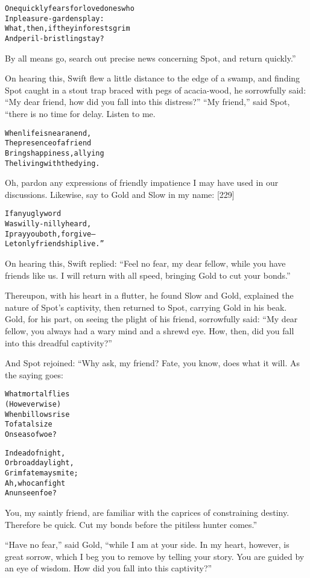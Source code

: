 \documentclass{article}
\renewenvironment{verbatim}{\begin{alltt}\normalfont\begin{centering}}{\end{centering}\end{alltt}}
\begin{document}
\begin{verbatim}
One quickly fears for loved ones who
    In pleasure-gardens play:
What, then, if they in forests grim
    And peril-bristling stay?
\end{verbatim}
By all means go, search out precise news concerning Spot, and
return quickly.”

On hearing this, Swift flew a little distance to the edge of a
swamp, and finding Spot caught in a stout trap braced with pegs of
acacia-wood, he sorrowfully said:
``My dear friend, how did you fall into this distress?''
``My friend,'' said Spot, “there is no time for delay. Listen to
me.

\begin{verbatim}
When life is near an end,
The presence of a friend
Brings happiness, allying
The living with the dying.
\end{verbatim}
Oh, pardon any expressions of friendly impatience I may have used
in our discussions. Likewise, say to Gold and Slow in my name:
[229]

\begin{verbatim}
If any ugly word
Was willy-nilly heard,
I pray you both, forgive--
Let only friendship live.”
\end{verbatim}
On hearing this, Swift replied:
``Feel no fear, my dear fellow, while you have friends like us. I will return with all speed, bringing Gold to cut your bonds.''

Thereupon, with his heart in a flutter, he found Slow and Gold,
explained the nature of Spot's captivity, then returned to Spot,
carrying Gold in his beak. Gold, for his part, on seeing the plight
of his friend, sorrowfully said:
``My dear fellow, you always had a wary mind and a shrewd eye. How, then, did you fall into this dreadful captivity?''

And Spot rejoined: “Why ask, my friend? Fate, you know, does what
it will. As the saying goes:

\begin{verbatim}
What mortal flies
(However wise)
When billows rise
To fatal size
    On seas of woe?

In dead of night,
Or broad daylight,
Grim fate may smite;
Ah, who can fight
    An unseen foe?
\end{verbatim}
You, my saintly friend, are familiar with the caprices of
constraining destiny. Therefore be quick. Cut my bonds before the
pitiless hunter comes.”

``Have no fear,'' said Gold,
``while I am at your side. In my heart, however, is great sorrow, which I beg you to remove by telling your story. You are guided by an eye of wisdom. How did you fall into this captivity?''
\end{document}
